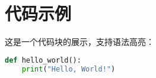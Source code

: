 \section{代码示例}

这是一个代码块的展示，支持语法高亮：

\begin{lstlisting}[language=Python, caption=Python 代码示例]
def hello_world():
    print("Hello, World!")
\end{lstlisting}

\newpage